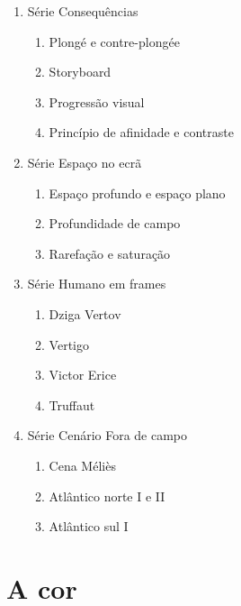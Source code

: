 \begin{enumerate}
	\item Série Consequências

    \begin{enumerate}[topsep = 0pt]
		      \def\labelenumi{\arabic{enumi}.}
		      \item Plongé e contre-plongée
		      \item Storyboard
		      \item Progressão visual
		      \item Princípio de afinidade e contraste
	      \end{enumerate}

	\item Série Espaço no ecrã

    \begin{enumerate}[topsep = 0pt]
		      \def\labelenumii{\arabic{enumii}.}
		      \item Espaço profundo e espaço plano
		      \item Profundidade de campo
		      \item Rarefação e saturação
	      \end{enumerate}
	\item Série Humano em frames

    \begin{enumerate}[topsep = 0pt]
		      \def\labelenumii{\arabic{enumii}.}
		      \item Dziga Vertov
		      \item Vertigo
		      \item Victor Erice
		      \item Truffaut
	      \end{enumerate}
	\item Série Cenário Fora de campo

    \begin{enumerate}[topsep = 0pt]
		      \def\labelenumii{\arabic{enumii}.}
		      \item Cena Méliès
		      \item Atlântico norte I e II
		      \item Atlântico sul I
	      \end{enumerate}
\end{enumerate}

\section{A cor}\label{a-cor}

